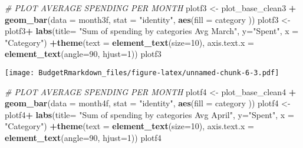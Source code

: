 \documentclass[
]{article}
\newenvironment{Shaded}{\begin{snugshade}}{\end{snugshade}}
\newcommand{\CommentTok}[1]{\textcolor[rgb]{0.56,0.35,0.01}{\textit{#1}}}
\newcommand{\DataTypeTok}[1]{\textcolor[rgb]{0.13,0.29,0.53}{#1}}
\newcommand{\DecValTok}[1]{\textcolor[rgb]{0.00,0.00,0.81}{#1}}
\newcommand{\KeywordTok}[1]{\textcolor[rgb]{0.13,0.29,0.53}{\textbf{#1}}}
\newcommand{\NormalTok}[1]{#1}
\newcommand{\OperatorTok}[1]{\textcolor[rgb]{0.81,0.36,0.00}{\textbf{#1}}}
\newcommand{\StringTok}[1]{\textcolor[rgb]{0.31,0.60,0.02}{#1}}
\begin{document}
\begin{Shaded}
\begin{Highlighting}[]
 \CommentTok{# PLOT AVERAGE SPENDING PER MONTH}
\NormalTok{ plotf3 <-}\StringTok{ }\NormalTok{plot_base_clean3 }\OperatorTok{+}\StringTok{ }\KeywordTok{geom_bar}\NormalTok{(}\DataTypeTok{data =}\NormalTok{ month3f, }\DataTypeTok{stat =} \StringTok{"identity"}\NormalTok{, }\KeywordTok{aes}\NormalTok{(}\DataTypeTok{fill =}\NormalTok{ category ))  }
\NormalTok{ plotf3 <-}\StringTok{ }\NormalTok{plotf3}\OperatorTok{+}\StringTok{ }\KeywordTok{labs}\NormalTok{(}\DataTypeTok{title=} \StringTok{"Sum of spending by categories Avg March"}\NormalTok{, }\DataTypeTok{y=}\StringTok{"Spent"}\NormalTok{, }\DataTypeTok{x =} \StringTok{"Category"}\NormalTok{) }\OperatorTok{+}\KeywordTok{theme}\NormalTok{(}\DataTypeTok{text =} \KeywordTok{element_text}\NormalTok{(}\DataTypeTok{size=}\DecValTok{10}\NormalTok{), }\DataTypeTok{axis.text.x =} \KeywordTok{element_text}\NormalTok{(}\DataTypeTok{angle=}\DecValTok{90}\NormalTok{, }\DataTypeTok{hjust=}\DecValTok{1}\NormalTok{)) }
\NormalTok{ plotf3}
\end{Highlighting}
\end{Shaded}

\texttt{[image: BudgetRmarkdown\_files/figure-latex/unnamed-chunk-6-3.pdf]}

\begin{Shaded}
\begin{Highlighting}[]
 \CommentTok{# PLOT AVERAGE SPENDING PER MONTH}
\NormalTok{ plotf4 <-}\StringTok{ }\NormalTok{plot_base_clean4 }\OperatorTok{+}\StringTok{ }\KeywordTok{geom_bar}\NormalTok{(}\DataTypeTok{data =}\NormalTok{ month4f, }\DataTypeTok{stat =} \StringTok{"identity"}\NormalTok{, }\KeywordTok{aes}\NormalTok{(}\DataTypeTok{fill =}\NormalTok{ category ))  }
\NormalTok{ plotf4 <-}\StringTok{ }\NormalTok{plotf4}\OperatorTok{+}\StringTok{ }\KeywordTok{labs}\NormalTok{(}\DataTypeTok{title=} \StringTok{"Sum of spending by categories Avg April"}\NormalTok{, }\DataTypeTok{y=}\StringTok{"Spent"}\NormalTok{, }\DataTypeTok{x =} \StringTok{"Category"}\NormalTok{) }\OperatorTok{+}\KeywordTok{theme}\NormalTok{(}\DataTypeTok{text =} \KeywordTok{element_text}\NormalTok{(}\DataTypeTok{size=}\DecValTok{10}\NormalTok{), }\DataTypeTok{axis.text.x =} \KeywordTok{element_text}\NormalTok{(}\DataTypeTok{angle=}\DecValTok{90}\NormalTok{, }\DataTypeTok{hjust=}\DecValTok{1}\NormalTok{)) }
\NormalTok{ plotf4}
\end{Highlighting}
\end{Shaded}
\end{document}

